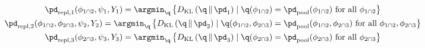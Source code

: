 \begin{gather}
  \pd_{\text{repl}, 1}(\phi_{1 \cap 2}, \psi_{1}, Y_{1}) =
  \argmin_{\q} \left\{
    D_{\mathrm{KL}}\left(\q \, \| \, \pd_{1}\right) \mid \q(\phi_{1 \cap 2}) = \pd_{\text{pool}}(\phi_{1 \cap 2}) \text { for all } \phi_{1 \cap 2}
  \right\} \\
  \pd_{\text{repl}, 2}(\phi_{1 \cap 2}, \phi_{2 \cap 3}, \psi_{2}, Y_{2}) =
  \argmin_{\q} \left\{
    D_{\mathrm{KL}}\left(\q \, \| \, \pd_{2}\right) \mid \q(\phi_{1 \cap 2}, \phi_{2 \cap 3}) = \pd_{\text{pool}}(\phi_{1 \cap 2}, \phi_{2 \cap 3}) \text{ for all } \phi_{1 \cap 2}, \phi_{2 \cap 3}
  \right\}
   \\
  \pd_{\text{repl}, 3}(\phi_{2 \cap 3}, \psi_{3}, Y_{3}) =
  \argmin_{\q} \left\{
    D_{\mathrm{KL}}\left(\q \, \| \, \pd_{3}\right) \mid \q(\phi_{2 \cap 3}) = \pd_{\text{pool}}(\phi_{2 \cap 3}) \text { for all } \phi_{2 \cap 3}
  \right\}
  \label{eqn:chained-marginal-replacement-kl}
\end{gather}